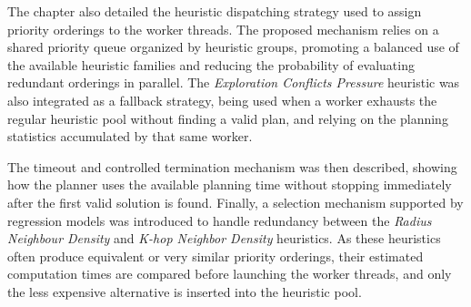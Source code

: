 The chapter also detailed the heuristic dispatching strategy used to assign priority orderings to
the worker threads. The proposed mechanism relies on a shared priority queue organized by
heuristic groups, promoting a balanced use of the available heuristic families and reducing the
probability of evaluating redundant orderings in parallel. The \textit{Exploration Conflicts Pressure}
heuristic was also integrated as a fallback strategy, being used when a worker exhausts the regular
heuristic pool without finding a valid plan, and relying on the planning statistics accumulated by
that same worker.

The timeout and controlled termination mechanism was then described, showing how the planner
uses the available planning time without stopping immediately after the first valid solution is found.
Finally, a selection mechanism supported by regression models was introduced to handle redundancy
between the \textit{Radius Neighbour Density} and \textit{K-hop Neighbor Density} heuristics. As these
heuristics often produce equivalent or very similar priority orderings, their estimated computation
times are compared before launching the worker threads, and only the less expensive alternative is
inserted into the heuristic pool.